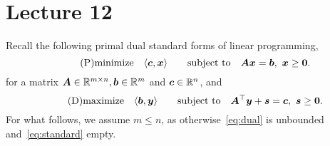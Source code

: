 %
%
% 


\chapter*{Lecture 12}
\setcounter{chapter}{12}
\setcounter{section}{0}
\setcounter{equation}{0}
\setcounter{theorem}{0}


Recall the following primal dual standard forms of linear programming,
\begin{equation}\label{eq:standard}\tag{P}
 \minimize \ip{\vct{c}}{\vct{x}} \quad \subjto \mtx{A}\vct{x}=\vct{b}, \ \vct{x}\geq \zerovct.
\end{equation}
for a matrix $\bm{A}\in \mathbb{R}^{m\times n}, \bm{b}\in \mathbb{R}^m$ and $\bm{c}\in \mathbb{R}^n$, 
and
\begin{equation}\label{eq:dual}\tag{D}
\text{maximize}\quad \langle {\bm{b}}, {\bm{y}} \rangle \quad \quad\text{subject to}\quad \bm{A}^{\top}\bm{y}+\bm{s}=\bm{c}, \ \bm{s}\geq \bm{0}.
\end{equation}
For what follows, we assume $m\leq n$, as otherwise~\eqref{eq:dual} is unbounded and~\eqref{eq:standard} empty.

